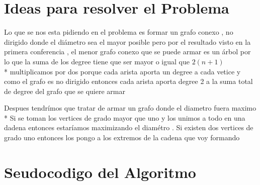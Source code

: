 \documentclass[10pt]{article}
\begin{document}
    \section{Ideas para resolver el Problema } 

    \noindent Lo que se nos esta pidiendo en el problema es formar un grafo conexo , no dirigido donde el di\'ametro sea el mayor posible 
    pero por el resultado visto en la primera conferencia , el menor grafo conexo que se puede armar es un \'arbol por lo que la suma de los degree tiene que ser mayor o igual  que $2\left(n+1\right)$  
    \\*
    multiplicamos por dos porque cada arista aporta un degree a cada vetice y como el grafo es no dirigido entonces cada arista aporta degree 2 a la suma total de degree del grafo que se quiere armar  

    \vspace*{0.5cm}
    Despues tendr\'imos que tratar de armar un grafo donde  el diametro fuera maximo 
    \\*
    Si se toman los vertices de grado mayor que uno y los unimos a todo en una dadena entonces estar\'iamos maximizando el diam\'etro . Si existen dos vertices de grado uno entonces los pongo a los extremos de la cadena que voy formando   
    \noindent 


    \section{Seudocodigo del Algoritmo } 
\end{document}
